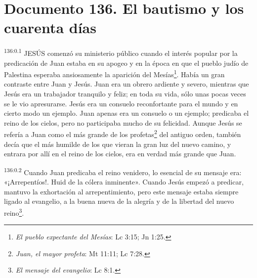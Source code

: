 \chapter{Documento 136. El bautismo y los cuarenta días}
\par
\textsuperscript{136:0.1} JESÚS comenzó su ministerio público cuando el interés popular por la predicación de Juan estaba en su apogeo y en la época en que el pueblo judío de Palestina esperaba ansiosamente la aparición del Mesías\footnote{\textit{El pueblo expectante del Mesías}: Lc 3:15; Jn 1:25.}. Había un gran contraste entre Juan y Jesús. Juan era un obrero ardiente y severo, mientras que Jesús era un trabajador tranquilo y feliz; en toda su vida, sólo unas pocas veces se le vio apresurarse. Jesús era un consuelo reconfortante para el mundo y en cierto modo un ejemplo. Juan apenas era un consuelo o un ejemplo; predicaba el reino de los cielos, pero no participaba mucho de su felicidad. Aunque Jesús se refería a Juan como el más grande de los profetas\footnote{\textit{Juan, el mayor profeta}: Mt 11:11; Lc 7:28.} del antiguo orden, también decía que el más humilde de los que vieran la gran luz del nuevo camino, y entrara por allí en el reino de los cielos, era en verdad más grande que Juan.

\par
\textsuperscript{136:0.2} Cuando Juan predicaba el reino venidero, lo esencial de su mensaje era: «¡Arrepentíos!. Huid de la cólera inminente». Cuando Jesús empezó a predicar, mantuvo la exhortación al arrepentimiento, pero este mensaje estaba siempre ligado al evangelio, a la buena nueva de la alegría y de la libertad del nuevo reino\footnote{\textit{El mensaje del evangelio}: Lc 8:1.}.


